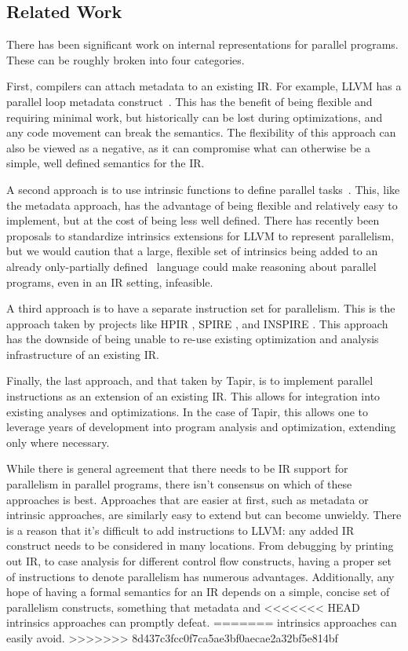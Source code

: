 \documentclass[sigconf]{acmart}
\begin{document}
\subsection{Related Work} \label{Sec:Related}

There has been significant work on internal representations for parallel
programs. These can be roughly broken into four categories.

First, compilers can attach metadata to an existing IR. For example, LLVM has a
parallel loop metadata construct~\cite{llvmref}. This has the benefit of being
flexible and requiring minimal work, but historically can be lost during
optimizations, and any code movement can break the semantics. The flexibility
of this approach can also be viewed as a negative, as it can compromise
what can otherwise be a simple, well defined semantics for the IR.

A second approach is to use intrinsic functions to define parallel tasks~\cite{ares}.
This, like the metadata approach, has the advantage of being
flexible and relatively easy to implement, but at the cost of being less well
defined. There has recently been proposals to standardize intrinsics extensions
for LLVM to represent parallelism, but we would caution that a large, flexible
set of intrinsics being added to an already only-partially defined~\cite{verillvm} language could make reasoning about parallel programs, even
in an IR setting, infeasible.

A third approach is to have a separate instruction set for parallelism. This is
the approach taken by projects like HPIR \cite{zhao2011intermediate}, SPIRE
\cite{khaldi2012spire}, and INSPIRE \cite{jordan2013inspire}. This approach has
the downside of being unable to re-use existing optimization and analysis
infrastructure of an existing IR.

Finally, the last approach, and that taken by Tapir, is to implement parallel
instructions as an extension of an existing IR. This allows for integration
into existing analyses and optimizations. In the case of Tapir, this allows one
to leverage years of development into program analysis and optimization,
extending only where necessary.

While there is general agreement that there needs to be IR support for
parallelism in parallel programs, there isn't consensus on which of these
approaches is best. Approaches that are easier at first, such as metadata
or intrinsic approaches, are similarly easy to extend but can become unwieldy. There is
a reason that it's difficult to add instructions to LLVM: any added IR
construct needs to be considered in many locations. From debugging by printing
out IR, to case analysis for different control flow constructs, having
a proper set of instructions to denote parallelism has numerous advantages.
Additionally, any hope of having a formal semantics for an IR depends on a
simple, concise set of parallelism constructs, something that metadata and
<<<<<<< HEAD
intrinsics approaches can promptly defeat.
=======
intrinsics approaches can easily avoid.
>>>>>>> 8d437c3fcc0f7ca5ae3bf0aecae2a32bf5e814bf
\end{document}
